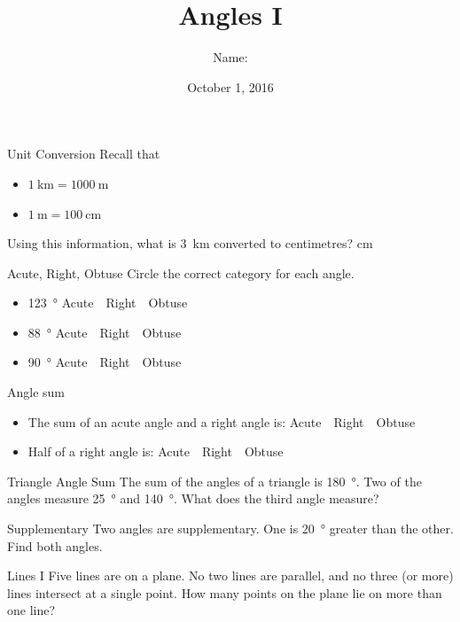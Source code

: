 \documentclass[14pt,letterpaper]{article}
\title{Angles I}
\author{Name: \underline{\hspace{5cm}}}
\date{October 1, 2016}
\begin{document}
\HomeworkTitle

\thispagestyle{empty}

\begin{problem}{Unit Conversion}
  Recall that \begin{itemize}
    \item $\SI{1}{\kilo\metre}=\SI{1000}{\metre}$
    \item $\SI{1}{\metre}=\SI{100}{\centi\metre}$
  \end{itemize}
  Using this information, what is \SI{3}{\kilo\metre} converted to centimetres?
  \hfill \blankE \si{\centi\metre}
\end{problem}

\begin{problem}{Acute, Right, Obtuse}
 Circle the correct category for each angle.

 \begin{itemize}
  \item \SI{123}{\degree} \hfill Acute~~Right~~Obtuse
  \item \SI{88}{\degree} \hfill Acute~~Right~~Obtuse
  \item \SI{90}{\degree} \hfill Acute~~Right~~Obtuse
 \end{itemize}
\end{problem}

\begin{problem}{Angle sum}
 \begin{itemize}
  \item The sum of an acute angle and a right angle is:
        \hfill Acute~~Right~~Obtuse
  \item Half of a right angle is:
        \hfill Acute~~Right~~Obtuse
 \end{itemize}
\end{problem}

\begin{problem}{Triangle Angle Sum}
 The sum of the angles of a triangle is \SI{180}{\degree}. Two of the angles
 measure \SI{25}{\degree} and \SI{140}{\degree}. What does the third angle
 measure?
\end{problem}

\begin{problem}{Supplementary}
 Two angles are supplementary. One is \SI{20}{\degree} greater than the other.
 Find both angles.
\end{problem}

\begin{problem}{Lines I}
 Five lines are on a plane. No two lines are parallel, and no three (or more)
 lines intersect at a single point. How many points on the plane lie on more
 than one line?
\end{problem}
\end{document}
